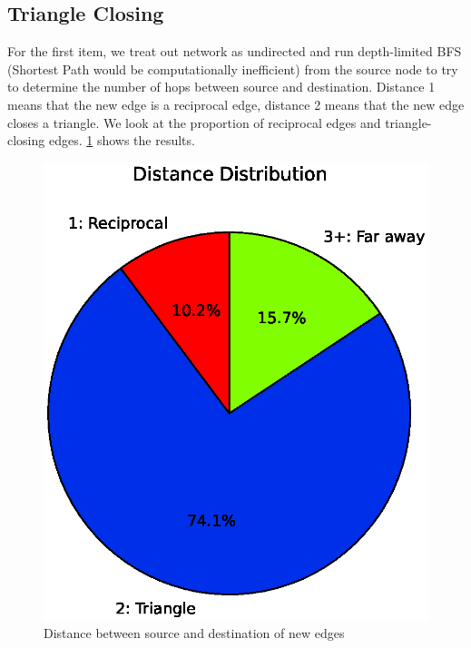 \documentclass[10pt]{article}
\begin{document}
\begin{multicols}{2}
\subsection{Triangle Closing}
For the first item, we treat out network as undirected and run depth-limited BFS (Shortest Path would be computationally inefficient) from the source node to try to determine the number of hops between source and destination. Distance 1 means that the new edge is a reciprocal edge, distance 2 means that the new edge closes a triangle. We look at the proportion of reciprocal edges and triangle-closing edges. \ref{fig:portion123} shows the results.
\begin{figure}[H]
    \centering
    \includegraphics[scale=0.4]{./distance_pie.eps}
    \caption{Distance between source and destination of new edges} \label{fig:portion123}
\end{figure}


\end{multicols}
\end{document}
